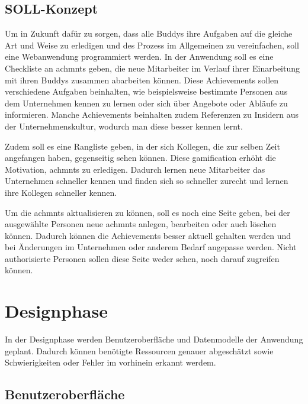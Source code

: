 \documentclass[11pt]{article}
\begin{document}
\subsection{SOLL-Konzept}

Um in Zukunft dafür zu sorgen, dass alle Buddys ihre Aufgaben auf die gleiche Art
und Weise zu erledigen und des Prozess im Allgemeinen zu vereinfachen, soll eine Webanwendung programmiert werden. 
In der Anwendung soll es eine Checkliste an \glspl{achmnt} geben, die neue Mitarbeiter im Verlauf ihrer Einarbeitung
mit ihren Buddys zusammen abarbeiten können. Diese Achievements sollen verschiedene Aufgaben beinhalten, wie beispielsweise bestimmte
Personen aus dem Unternehmen kennen zu lernen oder sich über Angebote oder Abläufe zu informieren. Manche Achievements beinhalten zudem
Referenzen zu Insidern aus der Unternehmenskultur, wodurch man diese besser kennen lernt.

Zudem soll es eine Rangliste geben, in der sich Kollegen, die zur selben Zeit angefangen haben, gegenseitig
sehen können. Diese \Gls{gamification} erhöht die Motivation, \glspl{achmnt} zu erledigen. Dadurch lernen neue Mitarbeiter
das Unternehmen schneller kennen und finden sich so schneller zurecht und lernen ihre Kollegen schneller kennen. 

Um die \glspl{achmnt} aktualisieren zu können, soll es noch eine Seite geben, bei der ausgewählte
Personen neue \glspl{achmnt} anlegen, bearbeiten oder auch löschen können. Dadurch können die Achievements besser aktuell gehalten werden und bei
Änderungen im Unternehmen oder anderem Bedarf angepasse werden.
Nicht authorisierte Personen sollen diese Seite weder sehen, noch darauf zugreifen können.


%
%

\section{Designphase}
In der Designphase werden Benutzeroberfläche und Datenmodelle der Anwendung geplant. Dadurch können benötigte Ressourcen
genauer abgeschätzt sowie Schwierigkeiten oder Fehler im vorhinein erkannt werdem. 

\subsection{Benutzeroberfläche}
\end{document}
